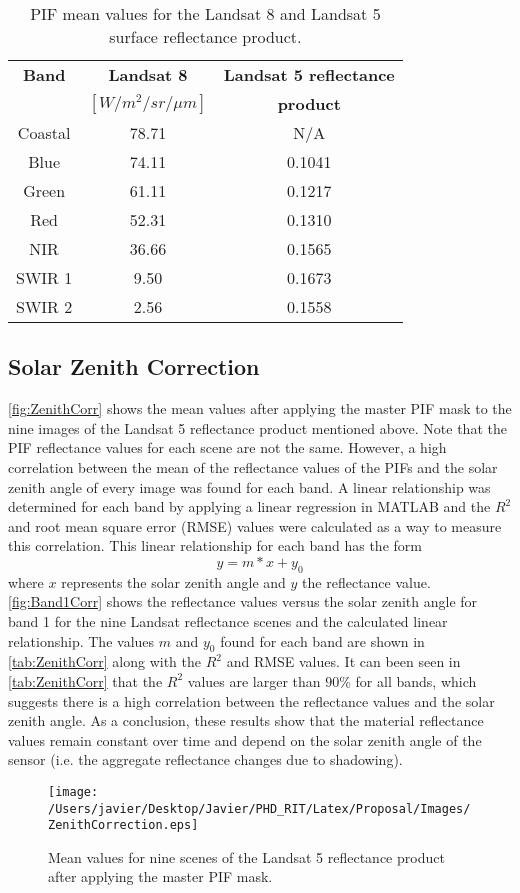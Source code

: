 \documentclass[]{spie}  %
\begin{document}
\begin{table}[!ht]
\caption{ PIF mean values for the Landsat 8 and Landsat 5 surface reflectance product. \label{tab:PIFvalues} } 
\centering
\begin{tabular}{c|c|c} 
 \bfseries{Band} & \bfseries{Landsat 8}& \bfseries{Landsat 5 reflectance}\\ 
 				 &	    $[W/m^2/sr/\mu m]$		   & \bfseries{product} \\ \hline \hline
 Coastal & 78.71 & N/A\\
 Blue    & 74.11 & 0.1041\\
 Green   & 61.11 & 0.1217\\
 Red     & 52.31 & 0.1310\\
 NIR     & 36.66 & 0.1565\\
 SWIR 1  & 9.50  & 0.1673\\ 
 SWIR 2  & 2.56  & 0.1558\\  
 \end{tabular}
\end{table}

\subsection{Solar Zenith Correction}
\autoref{fig:ZenithCorr} shows the mean values after applying the master PIF mask to the nine images of the Landsat 5 reflectance product mentioned above. Note that the PIF reflectance values for each scene are not the same. However, a high correlation between the mean of the reflectance values of the PIFs and the solar zenith angle of every image was found for each band. A linear relationship was determined for each band by applying a linear regression in MATLAB and the $R^2$ and root mean square error (RMSE) values were calculated as a way to measure this correlation. This linear relationship for each band has the form 
\begin{equation}
	y = m*x + y_0
	\label{eq:linear}
\end{equation}
where $x$ represents the solar zenith angle and $y$ the reflectance value. \autoref{fig:Band1Corr} shows the reflectance values versus the solar zenith angle for band 1 for the nine Landsat reflectance scenes and the calculated linear relationship. The values $m$ and $y_0$ found for each band are shown in \autoref{tab:ZenithCorr} along with the $R^2$ and RMSE values. It can been seen in \autoref{tab:ZenithCorr} that the $R^2$ values are larger than $90\%$ for all bands, which suggests there is a high correlation between the reflectance values and the solar zenith angle. As a conclusion, these results show that the material reflectance values remain constant over time and depend on the solar zenith angle of the sensor (i.e. the aggregate reflectance changes due to shadowing). 
\begin{figure}[!ht]
  	\centering
  	\texttt{[image: /Users/javier/Desktop/Javier/PHD\_RIT/Latex/Proposal/Images/ZenithCorrection.eps]}
  \caption{Mean values for nine scenes of the Landsat 5 reflectance product after applying the master PIF mask. \label{fig:ZenithCorr} } 
\end{figure}
\end{document}
